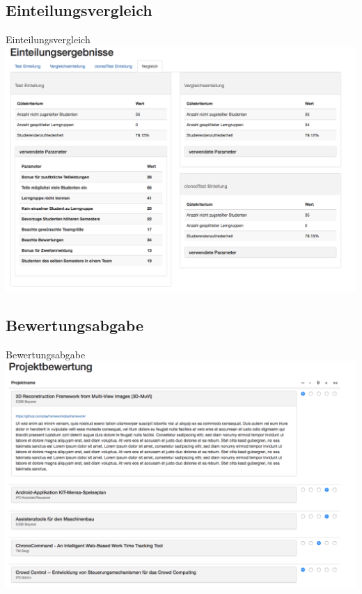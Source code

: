 \documentclass[18pt]{beamer}
\begin{document}
\subsection{Einteilungsvergleich}
\begin{frame}{Einteilungsvergleich}
\includegraphics[width=\linewidth]{bilder/comparison.png}
\end{frame}

\subsection{Bewertungsabgabe}
\begin{frame}{Bewertungsabgabe}
\includegraphics[width=\linewidth]{bilder/rating.png}
\end{frame}
\end{document}
